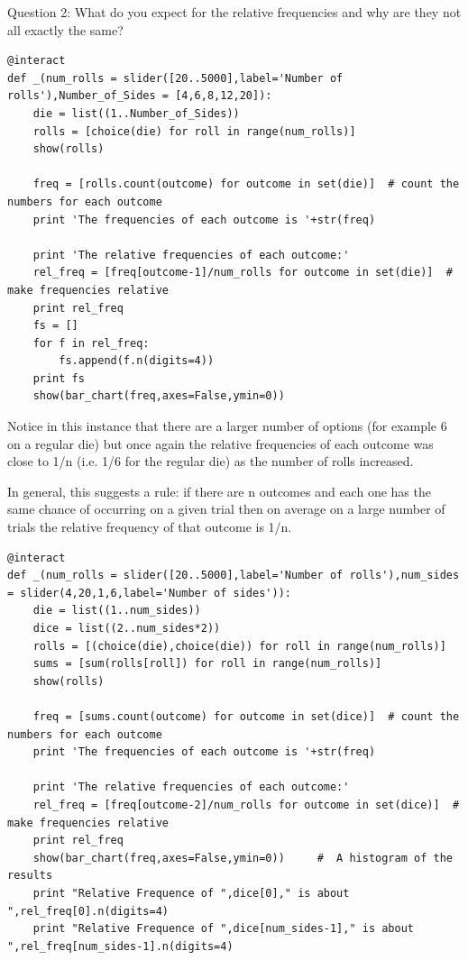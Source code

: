 \documentclass[10pt,]{book}
\theoremstyle{plain}
\theoremstyle{definition}
\theoremstyle{definition}
\numberwithin{equation}{section}
\begin{document}
Question 2: What do you expect for the relative frequencies and why are they not all exactly the same?
%
\begin{lstlisting}[style=sageinput]
@interact
def _(num_rolls = slider([20..5000],label='Number of rolls'),Number_of_Sides = [4,6,8,12,20]):
	die = list((1..Number_of_Sides))
	rolls = [choice(die) for roll in range(num_rolls)]
	show(rolls)   

	freq = [rolls.count(outcome) for outcome in set(die)]  # count the numbers for each outcome
	print 'The frequencies of each outcome is '+str(freq)

	print 'The relative frequencies of each outcome:'
	rel_freq = [freq[outcome-1]/num_rolls for outcome in set(die)]  # make frequencies relative
	print rel_freq
	fs = []
	for f in rel_freq:
		fs.append(f.n(digits=4))
	print fs
	show(bar_chart(freq,axes=False,ymin=0))
\end{lstlisting}
\par
Notice in this instance that there are a larger number of options (for example 6 on a regular
	die) but once again the relative frequencies of each  outcome was close to 1/n (i.e. 1/6 for the regular die)
	as the number of rolls increased.%
\par
In general, this suggests a rule: if there are n outcomes and each one has the same
	chance of occurring on a given trial then on average on a large number of trials the relative
	frequency of that outcome is 1/n.%
\begin{lstlisting}[style=sageinput]
@interact
def _(num_rolls = slider([20..5000],label='Number of rolls'),num_sides = slider(4,20,1,6,label='Number of sides')):
    die = list((1..num_sides))
    dice = list((2..num_sides*2))
    rolls = [(choice(die),choice(die)) for roll in range(num_rolls)]
    sums = [sum(rolls[roll]) for roll in range(num_rolls)]
    show(rolls)   

    freq = [sums.count(outcome) for outcome in set(dice)]  # count the numbers for each outcome
    print 'The frequencies of each outcome is '+str(freq)
    
    print 'The relative frequencies of each outcome:'
    rel_freq = [freq[outcome-2]/num_rolls for outcome in set(dice)]  # make frequencies relative
    print rel_freq        
    show(bar_chart(freq,axes=False,ymin=0))     #  A histogram of the results
    print "Relative Frequence of ",dice[0]," is about ",rel_freq[0].n(digits=4)
    print "Relative Frequence of ",dice[num_sides-1]," is about ",rel_freq[num_sides-1].n(digits=4)
\end{lstlisting}
\end{document}
